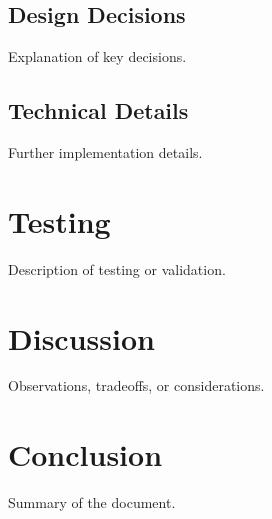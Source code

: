 \documentclass[11pt]{article}
\begin{document}
\subsection{Design Decisions}

Explanation of key decisions.

\subsection{Technical Details}

Further implementation details.

\section{Testing}

Description of testing or validation.

\section{Discussion}

Observations, tradeoffs, or considerations.

\section{Conclusion}

Summary of the document.
\end{document}
